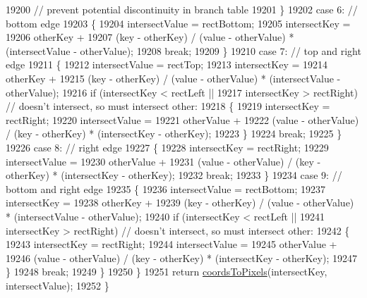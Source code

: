 \begin{DoxyCode}
19200            \textcolor{comment}{// prevent potential discontinuity in branch table}
19201   \}
19202   \textcolor{keywordflow}{case} 6: \textcolor{comment}{// bottom edge}
19203   \{
19204     intersectValue = rectBottom;
19205     intersectKey =
19206         otherKey +
19207         (key - otherKey) / (value - otherValue) * (intersectValue - otherValue);
19208     \textcolor{keywordflow}{break};
19209   \}
19210   \textcolor{keywordflow}{case} 7: \textcolor{comment}{// top and right edge}
19211   \{
19212     intersectValue = rectTop;
19213     intersectKey =
19214         otherKey +
19215         (key - otherKey) / (value - otherValue) * (intersectValue - otherValue);
19216     \textcolor{keywordflow}{if} (intersectKey < rectLeft ||
19217         intersectKey > rectRight) \textcolor{comment}{// doesn't intersect, so must intersect other:}
19218     \{
19219       intersectKey = rectRight;
19220       intersectValue =
19221           otherValue +
19222           (value - otherValue) / (key - otherKey) * (intersectKey - otherKey);
19223     \}
19224     \textcolor{keywordflow}{break};
19225   \}
19226   \textcolor{keywordflow}{case} 8: \textcolor{comment}{// right edge}
19227   \{
19228     intersectKey = rectRight;
19229     intersectValue =
19230         otherValue +
19231         (value - otherValue) / (key - otherKey) * (intersectKey - otherKey);
19232     \textcolor{keywordflow}{break};
19233   \}
19234   \textcolor{keywordflow}{case} 9: \textcolor{comment}{// bottom and right edge}
19235   \{
19236     intersectValue = rectBottom;
19237     intersectKey =
19238         otherKey +
19239         (key - otherKey) / (value - otherValue) * (intersectValue - otherValue);
19240     \textcolor{keywordflow}{if} (intersectKey < rectLeft ||
19241         intersectKey > rectRight) \textcolor{comment}{// doesn't intersect, so must intersect other:}
19242     \{
19243       intersectKey = rectRight;
19244       intersectValue =
19245           otherValue +
19246           (value - otherValue) / (key - otherKey) * (intersectKey - otherKey);
19247     \}
19248     \textcolor{keywordflow}{break};
19249   \}
19250   \}
19251   \textcolor{keywordflow}{return} \hyperlink{class_q_c_p_abstract_plottable_ade710a776104b14c1c835168ce1bfc5c}{coordsToPixels}(intersectKey, intersectValue);
19252 \}
\end{DoxyCode}


